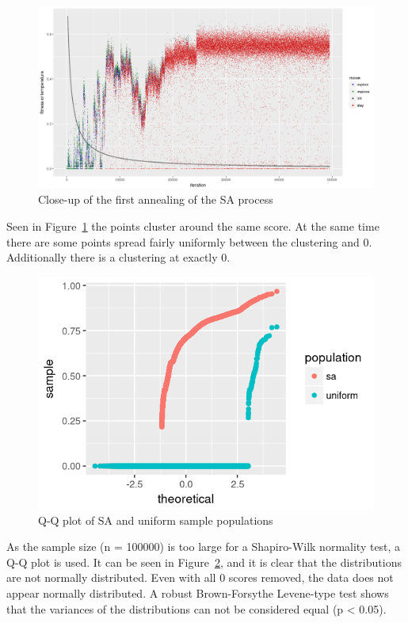 \begin{figure}
    \includegraphics[width=\textwidth]{figures/sa-progress-close}
    \caption{Close-up of the first annealing of the SA process}
    \label{fig:sa-progress-close}
\end{figure}

Seen in Figure~\ref{fig:sa-progress-close} the points cluster around the same score.
At the same time there are some points spread fairly uniformly between the clustering and 0.
Additionally there is a clustering at exactly 0.

\begin{figure}
    \includegraphics[width=\textwidth]{figures/sa-qq}
    \caption{Q-Q plot of SA and uniform sample populations}
    \label{fig:sa-qq}
\end{figure}

As the sample size (n = 100000) is too large for a Shapiro-Wilk normality test, a Q-Q plot is used.
It can be seen in Figure~\ref{fig:sa-qq}, and it is clear that the distributions are not normally distributed.
Even with all 0 scores removed, the data does not appear normally distributed.
A robust Brown-Forsythe Levene-type test shows that the variances of the distributions can not be considered equal (p < 0.05).

